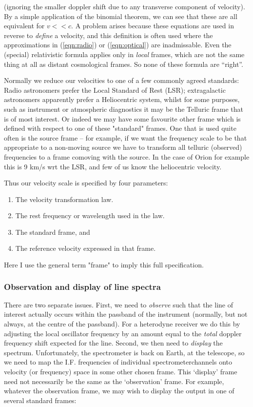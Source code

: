 \documentclass[twoside,11pt]{article}
\renewcommand{\_}{\texttt{\symbol{95}}}
\begin{document}
(ignoring the smaller doppler shift due to any transverse component of
velocity). By a simple application of the binomial theorem, we can see that
these are all equivalent for $v << c$. A problem arises because these
equations are used in reverse to \emph{define} a velocity, and this definition
is often used where the approximations in (\ref{eqn:radio}) or
(\ref{eqn:optical}) are inadmissable. Even the (special) relativistic formula
applies only in \emph{local} frames, which are not the same thing at all as
distant cosmological frames. So none of these formula are ``right''.

Normally we reduce our velocities to one of a few commonly agreed standards:
Radio astronomers prefer the Local Standard of Rest (LSR); extragalactic
astronomers apparently prefer a Heliocentric system, whilst for some purposes,
such as instrument or atmospheric diagnostics it may be the Telluric frame that
is of most interest. Or indeed we may have some favourite other frame which is
defined with respect to one of these "standard" frames. One that is used quite
often is the source frame -- for example, if we want the frequency scale to be
that appropriate to a non-moving source we have to transform all telluric
(observed) frequencies to a frame comoving with the source. In the case of
Orion for example this is 9 km/s wrt the LSR, and few of us know the 
heliocentric velocity. 

Thus our velocity scale is specified by four parameters:
\begin{enumerate}
\item      The velocity transformation law.
\item      The rest frequency or wavelength used in the law.
\item      The standard frame, and
\item      The reference velocity expressed in that frame.
\end{enumerate}
Here I use the general term "frame" to imply this full specification.

\subsubsection{Observation and display of line spectra}

There are two separate issues. First, we need to \emph{observe} such that the
line of interest actually occurs within the passband of the instrument
(normally, but not always, at the centre of the passband). For a heterodyne
receiver we do this by adjusting the local oscillator frequency by an amount
equal to the \emph{total} doppler frequency shift expected for the
line. Second, we then need to \emph{display} the spectrum. Unfortunately, the
spectrometer is back on Earth, at the telescope, so we need to map the
I.F. frequencies of individual spectrometerchannels onto velocity (or
frequency) space in some other chosen frame. This `display' frame need not
necessarily be the same as the `observation' frame.  For example, whatever the
observation frame, we may wish to display the output in one of several
standard frames:
\end{document}
